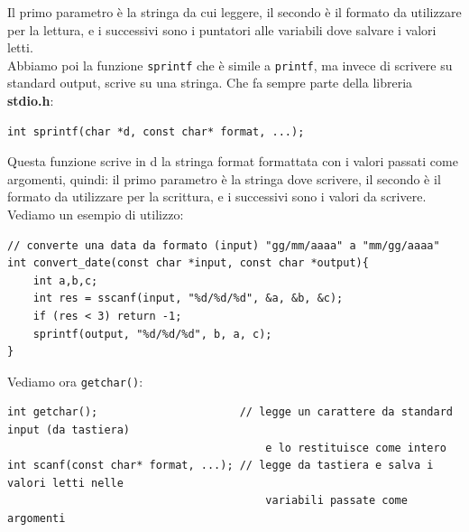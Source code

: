 Il primo parametro è la stringa da cui leggere, il secondo è il formato da utilizzare per la lettura, 
e i successivi sono i puntatori alle variabili dove salvare i valori letti.\\
Abbiamo poi la funzione \texttt{sprintf} che è simile a \texttt{printf}, ma invece di scrivere su standard output, scrive su una stringa.
Che fa sempre parte della libreria \textbf{stdio.h}:
\begin{verbatim}
int sprintf(char *d, const char* format, ...);
\end{verbatim}
Questa funzione scrive in d la stringa format formattata con i valori passati come argomenti, quindi:
il primo parametro è la stringa dove scrivere, il secondo è il formato da utilizzare per la scrittura, 
e i successivi sono i valori da scrivere.\\
Vediamo un esempio di utilizzo:
\begin{verbatim}
// converte una data da formato (input) "gg/mm/aaaa" a "mm/gg/aaaa"
int convert_date(const char *input, const char *output){
    int a,b,c;
    int res = sscanf(input, "%d/%d/%d", &a, &b, &c);
    if (res < 3) return -1;
    sprintf(output, "%d/%d/%d", b, a, c);
}
\end{verbatim}
Vediamo ora \texttt{getchar()}:
\begin{verbatim}
int getchar();                      // legge un carattere da standard input (da tastiera) 
                                        e lo restituisce come intero
int scanf(const char* format, ...); // legge da tastiera e salva i valori letti nelle 
                                        variabili passate come argomenti
\end{verbatim}
